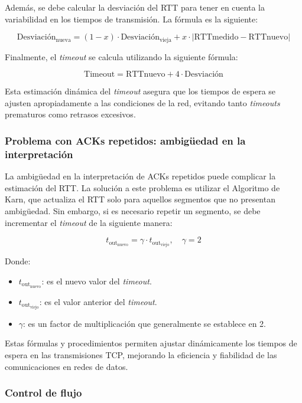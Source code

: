 \documentclass[a4paper,12pt]{article}
\begin{document}
Además, se debe calcular la desviación del RTT para tener en cuenta la variabilidad en los tiempos de transmisión. La fórmula es la siguiente:

\[
\text{Desviación}_{\text{nueva}} = (1 - x) \cdot \text{Desviación}_{\text{vieja}} + x \cdot \left| \text{RTTmedido} - \text{RTTnuevo} \right|
\]

Finalmente, el \textit{timeout} se calcula utilizando la siguiente fórmula:

\[
\text{Timeout} = \text{RTTnuevo} + 4 \cdot \text{Desviación}
\]

Esta estimación dinámica del \textit{timeout} asegura que los tiempos de espera se ajusten apropiadamente a las condiciones de la red, evitando tanto \textit{timeouts} prematuros como retrasos excesivos.

\subsubsection*{Problema con ACKs repetidos: ambigüedad en la interpretación}

La ambigüedad en la interpretación de ACKs repetidos puede complicar la estimación del RTT. La solución a este problema es utilizar el Algoritmo de Karn, que actualiza el RTT solo para aquellos segmentos que no presentan ambigüedad. Sin embargo, si es necesario repetir un segmento, se debe incrementar el \textit{timeout} de la siguiente manera:

\[
t_{\text{out}_{\text{nuevo}}} = \gamma \cdot t_{\text{out}_{\text{viejo}}}, \quad \gamma = 2
\]

Donde:
\begin{itemize}
    \item \( t_{\text{out}_{\text{nuevo}}} \): es el nuevo valor del \textit{timeout}.
    \item \( t_{\text{out}_{\text{viejo}}} \): es el valor anterior del \textit{timeout}.
    \item \( \gamma \): es un factor de multiplicación que generalmente se establece en 2.
\end{itemize}

Estas fórmulas y procedimientos permiten ajustar dinámicamente los tiempos de espera en las transmisiones TCP, mejorando la eficiencia y fiabilidad de las comunicaciones en redes de datos.

\subsubsection{Control de flujo}
\end{document}
